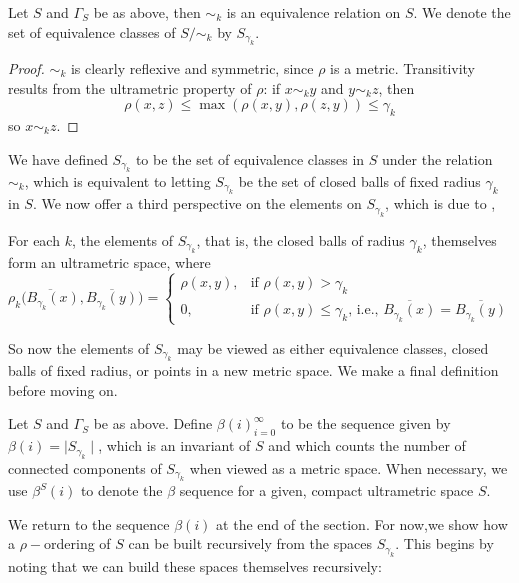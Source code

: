 \begin{proposition*}
Let  $S$ and $\Gamma_S$ be as above, then $\sim_k$ is an equivalence relation on $S$. We denote the set of equivalence classes of $S/\sim_k$ by $S_{\gamma_k}$.
\end{proposition*}

\begin{proof}
$\sim_k$ is clearly reflexive and symmetric, since $\rho$ is a metric. Transitivity results from the ultrametric property of $\rho$: if $x \sim_k y$ and $y \sim_k z$, then $$\rho(x, z) \leq \max(\rho(x,y), \rho(z,y)) \leq \gamma_k$$ so $x \sim_k z$. 
\end{proof}

We have defined  $S_{\gamma_k}$ to be the set of equivalence classes in $S$ under the relation $\sim_k$, which is equivalent to letting $S_{\gamma_k}$ be the set of closed balls of fixed radius $\gamma_k$ in  $S$. We now offer a third perspective on the elements on $S_{\gamma_k}$, which is due to \cite{na},

\begin{lemma*}
For each $k$, the elements of $S_{\gamma_k}$, that is, the closed balls of radius $\gamma_k$, themselves form an ultrametric space, where 
\[ \rho_k\overline{(B_{\gamma_k}(x)},\overline{B_{\gamma_k}(y)}) = 
\begin{cases}
\rho(x,y), & \text{if } \rho(x,y) > \gamma_k \\
0, & \text{if }   \rho(x,y) \leq \gamma_k \text{, i.e., } \overline{B_{\gamma_k}(x)}=\overline{B_{\gamma_k}(y)}
\end{cases}
\]
\end{lemma*}

So now the elements of $S_{\gamma_k}$ may be viewed as either equivalence classes, closed balls of fixed radius, or points in a new metric space. We make a final definition before moving on.

\begin{definition*}
Let $S$ and $\Gamma_S$ be as above. Define $\beta(i)_{i=0}^{\infty}$ to be the sequence given by $\beta(i) = \mid S_{\gamma_k}\mid$, which is an invariant of $S$ and which counts the number of connected components of $S_{\gamma_k}$ when viewed as a metric space. When necessary, we use $\beta^S(i)$ to denote the $\beta$ sequence for a given, compact  ultrametric space $S$.
\end{definition*}

We return to the sequence $\beta(i)$ at the end of the section. For now,we  show how a $\rho-$ordering of $S$ can be built recursively from the spaces $S_{\gamma_k}$. This begins by noting that we can build these spaces themselves recursively:

